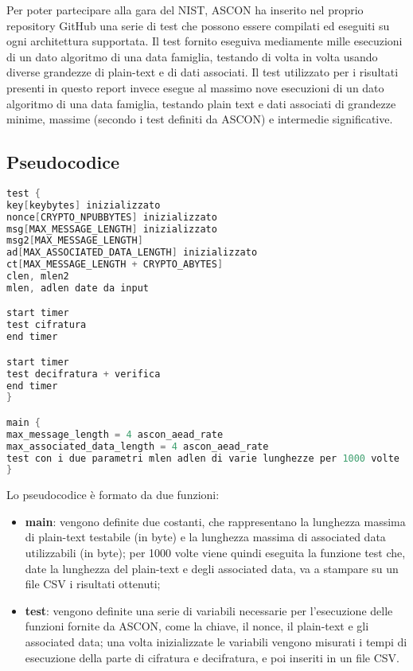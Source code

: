 \documentclass{report}
\begin{document}
Per poter partecipare alla gara del NIST, ASCON ha inserito nel proprio repository GitHub una serie di test che possono essere compilati ed eseguiti su ogni architettura supportata. Il test fornito eseguiva mediamente mille esecuzioni di un dato algoritmo di una data famiglia, testando di volta in volta usando diverse grandezze di plain-text e di dati associati. Il test utilizzato per i risultati presenti in questo report invece esegue al massimo nove esecuzioni di un dato algoritmo di una data famiglia, testando plain text e dati associati di grandezze minime, massime (secondo i test definiti da ASCON) e intermedie significative.

\subsection{Pseudocodice}

\begin{lstlisting}[language=C++]
test {
key[keybytes] inizializzato
nonce[CRYPTO_NPUBBYTES] inizializzato
msg[MAX_MESSAGE_LENGTH] inizializzato
msg2[MAX_MESSAGE_LENGTH]
ad[MAX_ASSOCIATED_DATA_LENGTH] inizializzato
ct[MAX_MESSAGE_LENGTH + CRYPTO_ABYTES]
clen, mlen2
mlen, adlen date da input

start timer
test cifratura
end timer

start timer
test decifratura + verifica
end timer
}

main {
max_message_length = 4 ascon_aead_rate
max_associated_data_length = 4 ascon_aead_rate
test con i due parametri mlen adlen di varie lunghezze per 1000 volte
}
\end{lstlisting}

Lo pseudocodice è formato da due funzioni:
\begin{itemize}
    \item \textbf{main}: vengono definite due costanti, che rappresentano la lunghezza massima di plain-text testabile (in byte) e la lunghezza massima di associated data utilizzabili (in byte); per 1000 volte viene quindi eseguita la funzione test che, date la lunghezza del plain-text e degli associated data, va a stampare su un file CSV i risultati ottenuti;
    \item \textbf{test}: vengono definite una serie di variabili necessarie per l'esecuzione delle funzioni fornite da ASCON, come la chiave, il nonce, il plain-text e gli associated data; una volta inizializzate le variabili vengono misurati i tempi di esecuzione della parte di cifratura e decifratura, e poi inseriti in un file CSV.
\end{itemize}
\end{document}
